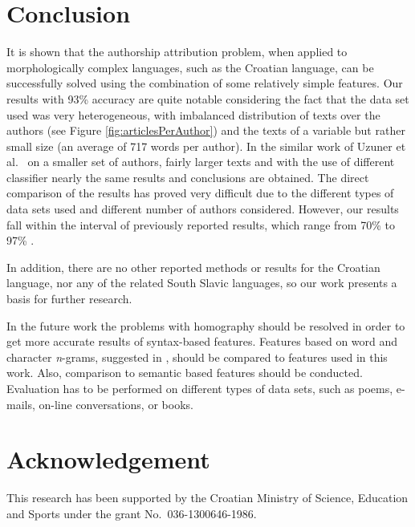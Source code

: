 \documentclass{llncs}
\begin{document}
\section{Conclusion}
It is shown that the authorship attribution problem, when applied to
morphologically complex languages, such as the Croatian language, can be
successfully solved using the combination of some relatively simple features. Our
results with 93\% accuracy are quite notable considering the fact that the data
set used was very heterogeneous, with imbalanced distribution of texts over the
authors (see Figure \ref{fig:articlesPerAuthor}) and the texts of a variable but
rather small size (an average of 717 words per author). In the similar work of
Uzuner et al.\ \cite{uzuner2005comparative} on a smaller set of authors, fairly
larger texts and with the use of different classifier nearly the same results and
conclusions are obtained. The direct comparison of the results has proved very
difficult due to the different types of data sets used  and different number of
authors considered. However, our results fall within the interval of previously
reported results, which range from 70\% to 97\%
\cite{coyotl2006authorship,keselj2003n,luyckx2005shallow,stamatatos2001computer,uzuner2005comparative}.

In addition, there are no other reported methods or results for the Croatian
language, nor any of the related South Slavic languages, so our work presents a
basis for further research.

In the future work the problems with homography should be resolved in order to
get more accurate results of syntax-based features. Features based on word and
character \emph{n}-grams, suggested in
\cite{coyotl2006authorship,keselj2003n,peng2003language}, should be compared to
features used in this work. Also, comparison to semantic based features
should be conducted. Evaluation has to be performed on different types
of data sets, such as poems, e-mails, on-line conversations, or books.


\section*{Acknowledgement}
This research has been supported by the Croatian Ministry of Science, Education
and Sports under the grant No.~036-1300646-1986.



\end{document}
